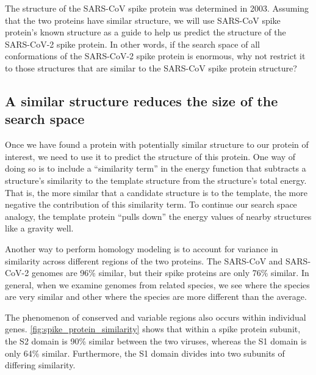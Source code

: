 The structure of the SARS-CoV spike protein was determined in 2003. Assuming that the two proteins have similar structure, we will use SARS-CoV spike protein's known structure as a guide to help us predict the structure of the SARS-CoV-2 spike protein. In other words, if the search space of all conformations of the SARS-CoV-2 spike protein is enormous, why not restrict it to those structures that are similar to the SARS-CoV spike protein structure?\\

\begin{qbox}\end{qbox}

\subsection{A similar structure reduces the size of the search space}

Once we have found a protein with potentially similar structure to our protein of interest, we need to use it to predict the structure of this protein. One way of doing so is to include a ``similarity term'' in the energy function that subtracts a structure's similarity to the template structure from the structure's total energy. That is, the more similar that a candidate structure is to the template, the more negative the contribution of this similarity term. To continue our search space analogy, the template protein ``pulls down'' the energy values of nearby structures like a gravity well.

Another way to perform homology modeling is to account for variance in similarity across different regions of the two proteins. The SARS-CoV and SARS-CoV-2 genomes are 96\% similar, but their spike proteins are only 76\% similar. In general, when we examine genomes from related species, we see  where the species are very similar and other  where the species are more different than the average.

The phenomenon of conserved and variable regions also occurs within individual genes. \autoref{fig:spike_protein_similarity} shows that within a spike protein subunit, the S2 domain is 90\% similar between the two viruses, whereas the S1 domain is only 64\% similar. Furthermore, the S1 domain divides into two subunits of differing similarity.

